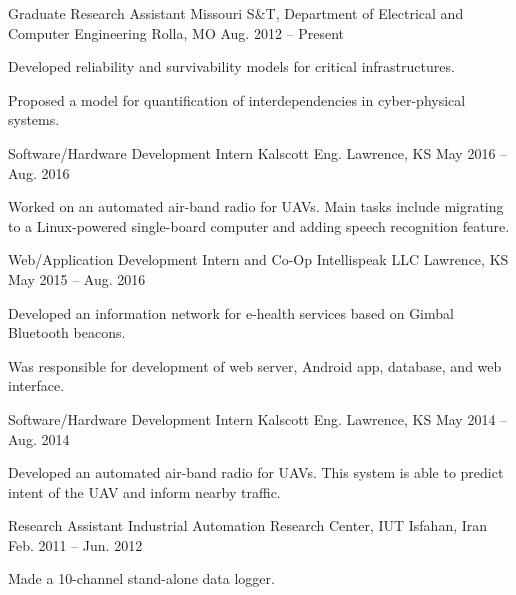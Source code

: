 \begin{cventries}
  \cventry
    {Graduate Research Assistant}
    {Missouri S\&T, Department of Electrical and Computer Engineering}
    {Rolla, MO}
    {Aug. 2012 -- Present}
    {
      \begin{cvitems}
        \item Developed reliability and survivability models for critical infrastructures.
        \item Proposed a model for quantification of interdependencies in cyber-physical systems.
      \end{cvitems}
    }
  \cventry
    {Software/Hardware Development Intern}
    {Kalscott Eng.}
    {Lawrence, KS}
    {May 2016 -- Aug. 2016}
    {
      \begin{cvitems}
        \item Worked on an automated air-band radio for UAVs. Main tasks include migrating to a Linux-powered single-board computer and adding speech recognition feature.
      \end{cvitems}
    }
  \cventry
    {Web/Application Development Intern and Co-Op}
    {Intellispeak LLC}
    {Lawrence, KS}
    {May 2015 -- Aug. 2016}
    {
      \begin{cvitems}
        \item Developed an information network for e-health services based on Gimbal Bluetooth beacons.
        \item Was responsible for development of web server, Android app, database, and web interface.
      \end{cvitems}
    }
  \cventry
    {Software/Hardware Development Intern}
    {Kalscott Eng.}
    {Lawrence, KS}
    {May 2014 -- Aug. 2014}
    {
      \begin{cvitems}
        \item Developed an automated air-band radio for UAVs. This system is able to predict intent of the UAV and inform nearby traffic.
      \end{cvitems}
    }
  \cventry
    {Research Assistant}
    {Industrial Automation Research Center, IUT}
    {Isfahan, Iran}
    {Feb. 2011 -- Jun. 2012}
    {
      \begin{cvitems}
        \item Made a 10-channel stand-alone data logger.

\end{cvitems}}
\end{cventries}
